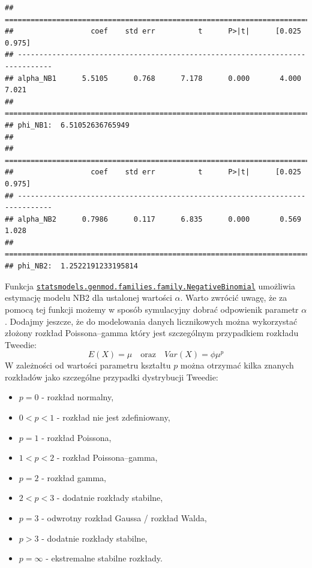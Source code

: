 \documentclass[polish,]{book}
\begin{document}
\begin{verbatim}
## ==============================================================================
##                  coef    std err          t      P>|t|      [0.025      0.975]
## ------------------------------------------------------------------------------
## alpha_NB1      5.5105      0.768      7.178      0.000       4.000       7.021
## ==============================================================================
## phi_NB1:  6.51052636765949 
## 
## ==============================================================================
##                  coef    std err          t      P>|t|      [0.025      0.975]
## ------------------------------------------------------------------------------
## alpha_NB2      0.7986      0.117      6.835      0.000       0.569       1.028
## ==============================================================================
## phi_NB2:  1.2522191233195814
\end{verbatim}

Funkcja \href{https://www.statsmodels.org/stable/generated/statsmodels.genmod.families.family.NegativeBinomial.html}{\texttt{statsmodels.genmod.families.family.NegativeBinomial}} umożliwia estymację modelu NB2 dla ustalonej wartości \(\alpha\). Warto zwrócić uwagę, że za pomocą tej funkcji możemy w sposób symulacyjny dobrać odpowienik parametr \(\alpha\). Dodajmy jeszcze, że do modelowania danych licznikowych można wykorzystać złożony rozkład Poissona--gamma który jest szczególnym przypadkiem rozkładu Tweedie:
\begin{equation}
E(X) = \mu \quad\mathrm{oraz}\quad Var(X) = \phi\mu^p
\label{eq:ub021}
\end{equation}
W zależności od wartości parametru kształtu \(p\) można otrzymać
kilka znanych rozkładów jako szczególne przypadki dystrybucji Tweedie:

\begin{itemize}
\item
  \(p = 0\) - rozkład normalny,
\item
  \(0 < p < 1\) - rozkład nie jest zdefiniowany,
\item
  \(p = 1\) - rozkład Poissona,
\item
  \(1 <p <2\) - rozkład Poissona--gamma,
\item
  \(p = 2\) - rozkład gamma,
\item
  \(2 <p <3\) - dodatnie rozkłady stabilne,
\item
  \(p = 3\) - odwrotny rozkład Gaussa / rozkład Walda,
\item
  \(p> 3\) - dodatnie rozkłady stabilne,
\item
  \(p =\infty\) - ekstremalne stabilne rozkłady.
\end{itemize}
\end{document}
